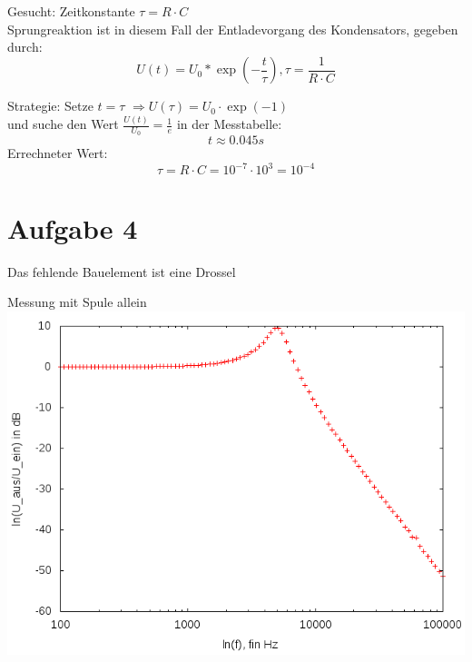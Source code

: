 \documentclass[compress,11pt]{beamer}
\begin{document}
\begin{frame}
Gesucht: Zeitkonstante $\tau = R \cdot C$\\
Sprungreaktion ist in diesem Fall der Entladevorgang des Kondensators, gegeben durch:
\begin{equation}
U(t) = U_0 * \exp(-\frac{t}{\tau}),  \tau = \frac{1}{R\cdot C}
\end{equation}
\end{frame}
\begin{frame}
Strategie: Setze $t=\tau$ $\Rightarrow  U(\tau) = U_0 \cdot \exp(-1)$\\
und suche den Wert $\frac{U(t)}{U_0} = \frac{1}{e}$ in der Messtabelle:
\begin{equation}
t \approx 0.045 s
\end{equation}
Errechneter Wert:
\begin{equation}
\tau = R \cdot C = 10^{-7} \cdot 10^{3} = 10^{-4}
\end{equation}
\end{frame}
\section{Aufgabe 4}
\begin{frame}
\begin{block}{Das fehlende Bauelement ist eine Drossel}
\centering
\end{block}
\end{frame}

\begin{frame}
\begin{block}{Messung mit Spule allein}
\centering
\includegraphics[width=.85\textwidth]{../daten/Messdaten/plots/Aufgabe4Bodediagramm_tief_gain}
\end{block}
\end{frame}
\end{document}

